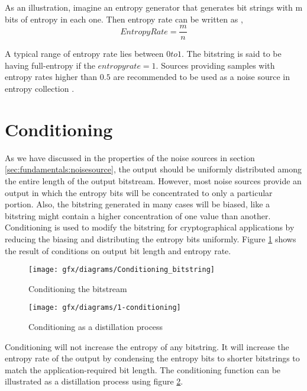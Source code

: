 As an illustration, imagine an entropy generator that generates bit strings with m bits of entropy in each one. Then entropy rate can be written as \cite{SP90B-2018},
\begin{equation*}
Entropy Rate = \frac{m}{n}
\end{equation*}

A typical range of entropy rate lies between $0 to 1$. The bitstring is said to be having full-entropy if the $entropy rate = 1$. Sources providing samples with entropy rates higher than $0.5$ are recommended to be used as a noise source in entropy collection \cite{SP90B-2018}.  
%
%
\section{Conditioning}
\label{sec:fundamentals:conditioning}

As we have discussed in the properties of the noise sources in section \ref{sec:fundamentals:noisesource}, the output should be uniformly distributed among the entire length of the output bitstream. However, most noise sources provide an output in which the entropy bits will be concentrated to only a particular portion. Also, the bitstring generated in many cases will be biased, like a bitstring might contain a higher concentration of one value than another. Conditioning is used to modify the bitstring for cryptographical applications by reducing the biasing and distributing the entropy bits uniformly. Figure \ref{fig:2:5} shows the result of conditions on output bit length and entropy rate.

\begin{figure}[htbp]
	\centering
	\texttt{[image: gfx/diagrams/Conditioning\_bitstring]}
	\caption{Conditioning the bitstream}
	\label{fig:2:5}
\end{figure}
 
\begin{figure}[htbp]
	\centering
	\texttt{[image: gfx/diagrams/1-conditioning]}
	\caption{Conditioning as a distillation process}
	\label{fig:2:6}
\end{figure}

Conditioning will not increase the entropy of any bitstring. It will increase the entropy rate of the output by condensing the entropy bits to shorter bitstrings to match the application-required bit length. The conditioning function can be illustrated as a distillation process using figure \ref{fig:2:6}.\\

